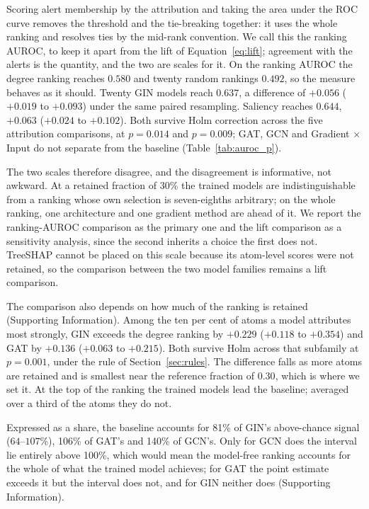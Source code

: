 \documentclass[journal=jcisd8,manuscript=article]{achemso}
\begin{document}
Scoring alert membership by the attribution and taking the area under the ROC curve removes
the threshold and the tie-breaking together: it uses the whole ranking and resolves ties by
the mid-rank convention. We call this the ranking AUROC, to keep it apart from the lift of
Equation~\ref{eq:lift}; agreement with the alerts is the quantity, and the two are scales for
it. On the ranking AUROC the degree ranking reaches $0.580$ and twenty random
rankings $0.492$, so the measure behaves as it should. Twenty GIN models reach $0.637$, a
difference of $+0.056$ ($+0.019$ to $+0.093$) under the same paired resampling. Saliency
reaches $0.644$, $+0.063$ ($+0.024$ to $+0.102$). Both survive Holm correction across the
five attribution comparisons, at $p = 0.014$ and $p = 0.009$; GAT, GCN and Gradient
$\times$ Input do not separate from the baseline (Table~\ref{tab:auroc_p}).



The two scales therefore disagree, and the disagreement is informative, not awkward.
At a retained fraction of 30\% the trained models are indistinguishable from a ranking whose
own selection is seven-eighths arbitrary; on the whole ranking, one architecture and one
gradient method are ahead of it. We report the ranking-AUROC comparison as the primary one
and the lift comparison as a sensitivity analysis, since the second inherits a choice the
first does not. TreeSHAP cannot be placed on this scale because its atom-level scores were
not retained, so the comparison between the two model families remains a lift comparison.

The comparison also depends on how much of the ranking is retained
(Supporting Information). Among the ten per cent of atoms a model attributes most strongly, GIN exceeds the degree
ranking by $+0.229$ ($+0.118$ to $+0.354$) and GAT by $+0.136$ ($+0.063$ to $+0.215$). Both
survive Holm across that subfamily at $p = 0.001$, under the rule of
Section~\ref{sec:rules}. The difference falls as more atoms are
retained and is smallest near the reference fraction of $0.30$, which is where we set it. At
the top of the ranking the trained models lead the baseline; averaged over a third of the
atoms they do not.


Expressed as a share, the baseline accounts for 81\% of GIN's above-chance signal
($64$--$107$\%), 106\% of GAT's and 140\% of GCN's. Only for GCN does the interval lie
entirely above 100\%, which would mean the model-free ranking accounts for the whole of what
the trained model achieves; for GAT the point estimate exceeds it but the interval does not,
and for GIN neither does (Supporting Information).
\end{document}
